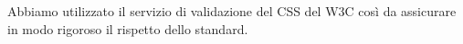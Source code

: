 Abbiamo utilizzato il servizio di validazione del CSS del W3C così da assicurare in modo rigoroso il rispetto dello standard.